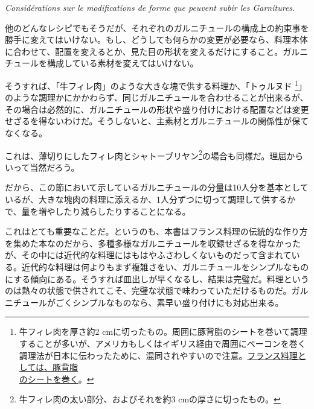 \vspace{-1\zw}
\begin{center}
\textit{Considérations sur le modifications de forme que peuvent subir les Garnitures.}
\end{center}
\vspace{1\zw}


他のどんなレシピでもそうだが、それぞれのガルニチュールの構成上の約束事を勝手に変えてはいけない。もし、どうしても何らかの変更が必要なら、料理本体に合わせて、配置を変えるとか、見た目の形状を変えるだけにすること。ガルニチュールを構成している素材を変えてはいけない。

そうすれば、「牛フィレ肉」のような大きな塊で供する料理か、「トゥルヌド
\footnote{牛フィレ肉を厚さ約2
  cmに切ったもの。周囲に豚背脂のシートを巻いて調理することが多いが、アメリカもしくはイギリス経由で周囲にベーコンを巻く調理法が日本に伝わったために、混同されやすいので注意。\ul{フランス料理としては、豚背脂\\のシートを巻く}。}」のような調理かにかかわらず、同じガルニチュールを合わせることが出来るが、その場合は必然的に、ガルニチュールの形状や盛り付けにおける配置などは変更せざるを得ないわけだ。そうしないと、主素材とガルニチュールの関係性が保てなくなる。

これは、薄切りにしたフィレ肉とシャトーブリヤン\footnote{牛フィレ肉の太い部分、およびそれを約3
  cmの厚さに切ったもの。}の場合も同様だ。理屈からいって当然だろう。

だから、この節において示しているガルニチュールの分量は10人分を基本としているが、大きな塊肉の料理に添えるか、1人分ずつに切って調理して供するかで、量を増やしたり減らしたりすることになる。

これはとても重要なことだ。というのも、本書はフランス料理の伝統的な作り方を集めた本なのだから、多種多様なガルニチュールを収録せざるを得なかったが、その中には近代的な料理にはもはやふさわしくないものだって含まれている。近代的な料理は何よりもまず複雑さをい、ガルニチュールをシンプルなものにする傾向にある。そうすれば皿出しが早くなるし、結果は完璧だ。料理というのは熱々の状態で供されてこそ、完璧な状態で味わっていただけるものだ。ガルニチュールがごくシンプルなものなら、素早い盛り付けにも対応出来る。


